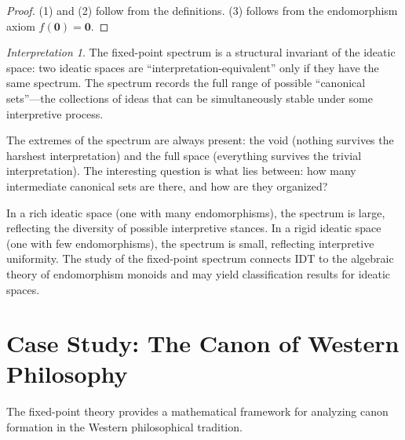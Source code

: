 \documentclass[11pt,openany]{book}
\theoremstyle{definition}
\theoremstyle{plain}
\theoremstyle{remark}
\newtheorem{interpretation}[axiom]{Interpretation}
\newcommand{\void}{\mathbf{0}}              %
\begin{document}
\begin{proof}
(1) and (2) follow from the definitions. (3) follows from the endomorphism axiom $f(\void) = \void$.
\end{proof}

\begin{interpretation}
The fixed-point spectrum is a structural invariant of the ideatic space: two ideatic spaces are ``interpretation-equivalent'' only if they have the same spectrum. The spectrum records the full range of possible ``canonical sets''---the collections of ideas that can be simultaneously stable under some interpretive process.

The extremes of the spectrum are always present: the void (nothing survives the harshest interpretation) and the full space (everything survives the trivial interpretation). The interesting question is what lies between: how many intermediate canonical sets are there, and how are they organized?

In a rich ideatic space (one with many endomorphisms), the spectrum is large, reflecting the diversity of possible interpretive stances. In a rigid ideatic space (one with few endomorphisms), the spectrum is small, reflecting interpretive uniformity. The study of the fixed-point spectrum connects IDT to the algebraic theory of endomorphism monoids and may yield classification results for ideatic spaces.
\end{interpretation}

\section{Case Study: The Canon of Western Philosophy}

The fixed-point theory provides a mathematical framework for analyzing canon formation in the Western philosophical tradition.
\end{document}

